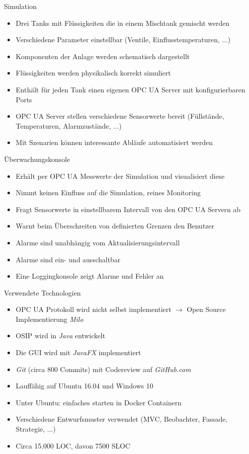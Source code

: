 \documentclass[22pt]{beamer}
\begin{document}
\begin{frame}{Simulation}
 \begin{itemize}[<+->]
  \item Drei Tanks mit Flüssigkeiten die in einem Mischtank gemischt werden
  \item Verschiedene Parameter einstellbar (Ventile, Einflusstemperaturen, ...)
  \item Komponenten der Anlage werden schematisch dargestellt
  \item Flüssigkeiten werden physikalisch korrekt simuliert
  \item Enthält für jeden Tank einen eigenen OPC UA Server mit konfigurierbaren Ports
  \item OPC UA Server stellen verschiedene Sensorwerte bereit (Füllstände, Temperaturen, Alarmzustände, ...)
  \item Mit Szenarien können interessante Abläufe automatisiert werden
 \end{itemize}
\end{frame}

\begin{frame}{Überwachungskonsole}
 \begin{itemize}[<+->]
  \item Erhält per OPC UA Messwerte der Simulation und visualisiert diese
  \item Nimmt keinen Einfluss auf die Simulation, reines Monitoring
  \item Fragt Sensorwerte in einstellbarem Intervall von den OPC UA Servern ab
  \item Warnt beim Überschreiten von definierten Grenzen den Benutzer
  \item Alarme sind unabhängig vom Aktualisierungsintervall
  \item Alarme sind ein- und ausschaltbar
  \item Eine Loggingkonsole zeigt Alarme und Fehler an
 \end{itemize}
\end{frame}

\begin{frame}{Verwendete Technologien}
\begin{itemize}[<+->]
 \item OPC UA Protokoll wird nicht selbst implementiert $\rightarrow$ Open Source Implementierung \emph{Milo}
 \item OSIP wird in \emph{Java} entwickelt
 \item Die GUI wird mit \emph{JavaFX} implementiert
 \item \emph{Git} (circa 800 Commits) mit Codereview auf \emph{GitHub.com}
 \item Lauffähig auf Ubuntu 16.04 und Windows 10
 \item Unter Ubuntu: einfaches starten in Docker Containern
 \item Verschiedene Entwurfsmuster verwendet (MVC, Beobachter, Fassade, Strategie, ...)
 \item Circa 15.000 LOC, davon 7500 SLOC
\end{itemize}
\end{frame}
\end{document}
